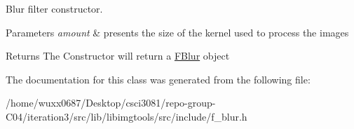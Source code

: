 Blur filter constructor. 


\begin{DoxyParams}{Parameters}
{\em amount} & presents the size of the kernel used to process the images \\
\hline
\end{DoxyParams}
\begin{DoxyReturn}{Returns}
The Constructor will return a \hyperlink{classimage__tools_1_1FBlur}{F\+Blur} object 
\end{DoxyReturn}


The documentation for this class was generated from the following file\+:\begin{DoxyCompactItemize}
\item 
/home/wuxx0687/\+Desktop/csci3081/repo-\/group-\/\+C04/iteration3/src/lib/libimgtools/src/include/f\+\_\+blur.\+h\end{DoxyCompactItemize}
